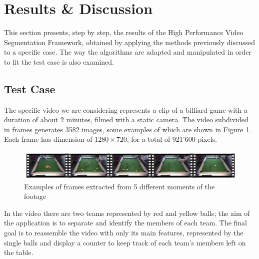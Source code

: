 \documentclass{usiinftr}
\begin{document}
\section{Results \& Discussion}
This section presents, step by step, the results of the High Performance Video Segmentation Framework, obtained by applying the methods previously discussed to a specific case. The way the algorithms are adapted and manipulated in order to fit the test case is also examined. 

\subsection{Test Case}
The specific video we are considering represents a clip of a billiard game with a duration of about 2 minutes, filmed with a static camera. The video subdivided in frames generates 3582 images, some examples of which are shown in Figure \ref{fig:4}. Each frame has dimension of $1280 \times 720$,  for a total of 921'600 pixels. \\
\begin{figure}[h]
	\centering
	\includegraphics[width=0.98\linewidth]{img/video_frames}
	\caption{Examples of frames extracted from 5 different moments of the footage}
	\label{fig:4}
\end{figure}

\noindent
In the video there are two teams represented by red and yellow balls; the aim of the application is to separate and identify the members of each team. The final goal is to reassemble the video with only its main features, represented by the single balls and display a counter to keep track of each team's members left on the table. 
\end{document}
